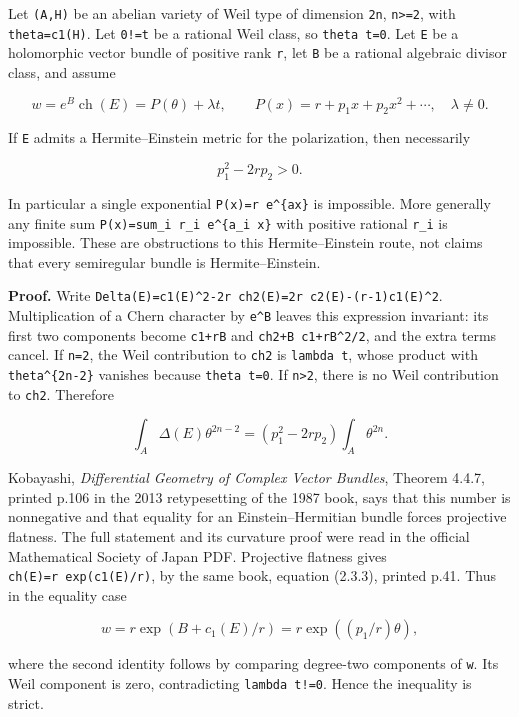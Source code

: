 \documentclass[11pt,a4paper]{article}
\theoremstyle{definition}
\begin{document}
Let \texttt{(A,H)} be an abelian variety of Weil type of dimension
\texttt{2n}, \texttt{n\textgreater{}=2}, with \texttt{theta=c1(H)}. Let
\texttt{0!=t} be a rational Weil class, so \texttt{theta\ t=0}. Let
\texttt{E} be a holomorphic vector bundle of positive rank \texttt{r},
let \texttt{B} be a rational algebraic divisor class, and assume

\[
 w=e^B\operatorname{ch}(E)=P(\theta)+\lambda t,\qquad
 P(x)=r+p_1x+p_2x^2+\cdots,\quad \lambda\ne0.
\]

If \texttt{E} admits a Hermite--Einstein metric for the polarization,
then necessarily

\[
 p_1^2-2rp_2>0.
\tag{DER1}
\]

In particular a single exponential \texttt{P(x)=r\ e\^{}\{ax\}} is
impossible. More generally any finite sum
\texttt{P(x)=sum\_i\ r\_i\ e\^{}\{a\_i\ x\}} with positive rational
\texttt{r\_i} is impossible. These are obstructions to this
Hermite--Einstein route, not claims that every semiregular bundle is
Hermite--Einstein.

\textbf{Proof.} Write
\texttt{Delta(E)=c1(E)\^{}2-2r\ ch2(E)=2r\ c2(E)-(r-1)c1(E)\^{}2}.
Multiplication of a Chern character by \texttt{e\^{}B} leaves this
expression invariant: its first two components become \texttt{c1+rB} and
\texttt{ch2+B\ c1+rB\^{}2/2}, and the extra terms cancel. If
\texttt{n=2}, the Weil contribution to \texttt{ch2} is
\texttt{lambda\ t}, whose product with \texttt{theta\^{}\{2n-2\}}
vanishes because \texttt{theta\ t=0}. If \texttt{n\textgreater{}2},
there is no Weil contribution to \texttt{ch2}. Therefore

\[
 \int_A\Delta(E)\theta^{2n-2}
 =(p_1^2-2rp_2)\int_A\theta^{2n}.
\]

Kobayashi, \emph{Differential Geometry of Complex Vector Bundles},
Theorem 4.4.7, printed p.106 in the 2013 retypesetting of the 1987 book,
says that this number is nonnegative and that equality for an
Einstein--Hermitian bundle forces projective flatness. The full
statement and its curvature proof were read in the official Mathematical
Society of Japan PDF. Projective flatness gives
\texttt{ch(E)=r\ exp(c1(E)/r)}, by the same book, equation (2.3.3),
printed p.41. Thus in the equality case

\[
 w=r\exp(B+c_1(E)/r)
   =r\exp((p_1/r)\theta),
\]

where the second identity follows by comparing degree-two components of
\texttt{w}. Its Weil component is zero, contradicting
\texttt{lambda\ t!=0}. Hence the inequality is strict.
\end{document}
